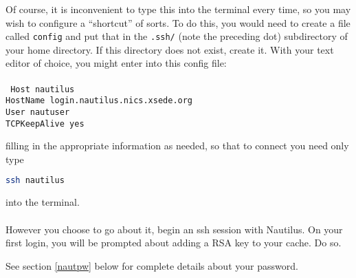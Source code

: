 Of course, it is inconvenient to type this into the terminal every time, so you may wish to configure a ``shortcut'' of sorts.  To do this, you would need to create a file called \texttt{config} and put that in the \texttt{.ssh/} (note the preceding dot) subdirectory of your home directory.  If this directory does not exist, create it.  With your text editor of choice, you might enter into this config file:\\\\
%
\texttt{ Host nautilus\\
HostName login.nautilus.nics.xsede.org\\
User nautuser\\
TCPKeepAlive yes\\
}

filling in the appropriate information as needed, so that to connect you need only type
\begin{lstlisting}[language=sh]
ssh nautilus
\end{lstlisting}%
into the terminal.\\\\
%
However you choose to go about it, begin an ssh session with Nautilus.  On your first login, you will be prompted about adding a RSA key to your cache.  Do so.


See section \ref{nautpw} below for complete details about your password.

